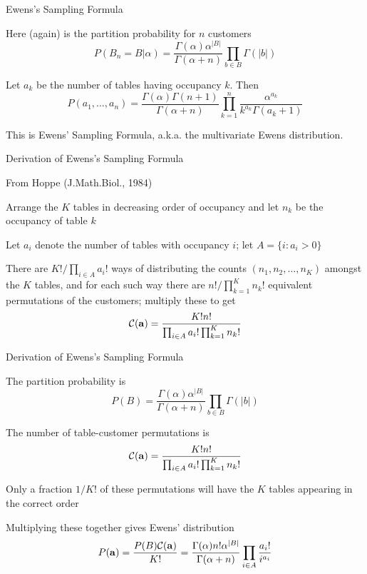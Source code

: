 \documentclass{beamer}
\begin{document}
\begin{frame}{Ewens's Sampling Formula}

Here (again) is the partition probability for $n$ customers
\[
P(B_n = B|\alpha) = \frac{\Gamma(\alpha) \alpha^{|B|}}{\Gamma(\alpha+n)} \prod_{b \in B} \Gamma(|b|)
\]

Let $a_k$ be the number of tables having occupancy $k$. Then
\[
P(a_1,\ldots,a_n) = \frac{\Gamma(\alpha) \Gamma(n+1)}{\Gamma(\alpha+n)} \prod_{k=1}^n \frac{\alpha^{a_k}}{k^{a_k} \Gamma(a_k+1)}
\]

This is \alert{Ewens' Sampling Formula}, a.k.a. the \alert{multivariate Ewens distribution}.

\end{frame}


\begin{frame}{Derivation of Ewens's Sampling Formula}

From Hoppe (J.Math.Biol., 1984)
\itemb
\item Arrange the $K$ tables in decreasing order of occupancy and let $n_k$ be the occupancy of table $k$
\item Let $a_i$ denote the number of tables with occupancy $i$; let $A = \{ i : a_i > 0 \}$
\item There are $K!/\prod_{i \in A} a_i!$ ways of distributing the counts $(n_1,n_2,\ldots,n_K)$ amongst the $K$ tables,
and for each such way there are $n!/\prod_{k=1}^K n_k!$ equivalent permutations of the customers; multiply these to get
\[
{\cal C}({\bf a}) = \frac{K! n!}{\prod_{i \in A} a_i! \prod_{k=1}^K n_k!}
\]
\iteme

\end{frame}


\begin{frame}{Derivation of Ewens's Sampling Formula}

\itemb
\item The partition probability is
\[
P(B) = \frac{\Gamma(\alpha) \alpha^{|B|}}{\Gamma(\alpha+n)} \prod_{b \in B} \Gamma(|b|)
\]
\item The number of table-customer permutations is
\[
{\cal C}({\bf a}) = \frac{K! n!}{\prod_{i \in A} a_i! \prod_{k=1}^K n_k!}
\]
\item Only a fraction $1/K!$ of these permutations will have the $K$ tables appearing in the correct order
\item Multiplying these together gives Ewens' distribution
\[
P({\bf a}) = \frac{P(B) {\cal C}({\bf a})}{K!} = \frac{\Gamma(\alpha) n! \alpha^{|B|}}{\Gamma(\alpha+n)} \prod_{i \in A} \frac{a_i!}{i^{a_i}}
\]
\iteme

\end{frame}
\end{document}
